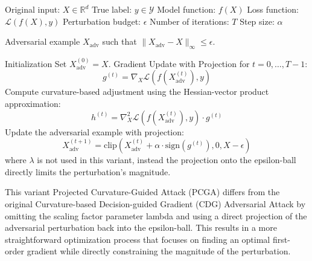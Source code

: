 Original input: $X \in \mathbb{R}^d$
True label: $y \in \mathcal{Y}$
Model function: $f(X)$
Loss function: $\mathcal{L}(f(X), y)$
Perturbation budget: $\epsilon$
Number of iterations: $T$
Step size: $\alpha$

Adversarial example $X_{\text{adv}}$ such that $\|X_{\text{adv}} - X\|_\infty \leq \epsilon$.



Initialization Set $X^{(0)}_{\text{adv}} = X$.
Gradient Update with Projection for $t = 0, \dots, T-1$:
    \[
    g^{(t)} = \nabla_X \mathcal{L}(f(X^{(t)}_{\text{adv}}), y)
    \]
    Compute curvature-based adjustment using the Hessian-vector product approximation:
    \[
    h^{(t)} = \nabla^2_X \mathcal{L}(f(X^{(t)}_{\text{adv}}), y) \cdot g^{(t)}
    \]
    Update the adversarial example with projection:
    \[
    X^{(t+1)}_{\text{adv}} = \text{clip}\left(X^{(t)}_{\text{adv}} + \alpha \cdot \text{sign}(g^{(t)}), 0, X - \epsilon\right)
    \]
    where $\lambda$ is not used in this variant, instead the projection onto the epsilon-ball directly limits the perturbation's magnitude.


This variant Projected Curvature-Guided Attack (PCGA) differs from the original Curvature-based Decision-guided Gradient (CDG) Adversarial Attack by omitting the scaling factor parameter lambda and using a direct projection of the adversarial perturbation back into the epsilon-ball. This results in a more straightforward optimization process that focuses on finding an optimal first-order gradient while directly constraining the magnitude of the perturbation.